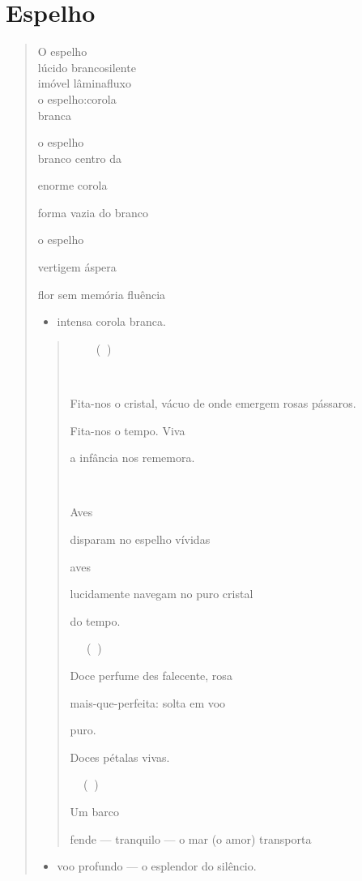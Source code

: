 \chapter{Espelho}

\begin{verse}
O espelho\\
lúcido branco\qquad silente\\
imóvel lâmina\qquad fluxo\\
o espelho:\qquad\qquad corola\\
\qquad\qquad\qquad\qquad branca

o espelho\\
branco centro da

enorme corola

forma vazia do branco

o espelho

vertigem áspera

flor sem memória fluência

\begin{itemize}
\item
  intensa corola branca.
\end{itemize}

\begin{quote}
 ()



Fita-nos o cristal, vácuo de onde emergem rosas pássaros.

Fita-nos o tempo. Viva

a infância nos rememora.



Aves

disparam no espelho vívidas

aves

lucidamente navegam no puro cristal

do tempo.

 ()

Doce perfume des falecente, rosa

mais-que-perfeita: solta em voo

puro.

Doces pétalas vivas.

 ()

Um barco

fende --- tranquilo --- o mar (o amor) transporta
\end{quote}

\begin{itemize}
\item
  voo profundo --- o esplendor do silêncio.
\end{itemize}


\end{verse}
